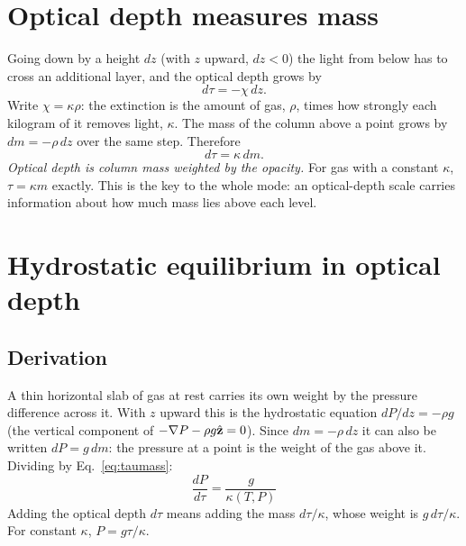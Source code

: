 \section{Optical depth measures mass}\label{sec:taumass}
Going down by a height $dz$ (with $z$ upward, $dz<0$) the light from below has to cross an additional layer, and the optical
depth grows by
\begin{equation}
d\tau=-\chi\,dz .\label{eq:dtau}
\end{equation}
Write $\chi=\kappa\rho$: the extinction is the amount of gas, $\rho$, times how strongly each kilogram of it removes light,
$\kappa$. The mass of the column above a point grows by $dm=-\rho\,dz$ over the same step. Therefore
\begin{equation}
d\tau=\kappa\,dm .\label{eq:taumass}
\end{equation}
\emph{Optical depth is column mass weighted by the opacity.} For gas with a constant $\kappa$, $\tau=\kappa m$ exactly. This
is the key to the whole mode: an optical-depth scale carries information about how much mass lies above each level.

\section{Hydrostatic equilibrium in optical depth}\label{sec:hse}
\subsection{Derivation}
A thin horizontal slab of gas at rest carries its own weight by the pressure difference across it. With $z$ upward this is
the hydrostatic equation $dP/dz=-\rho g$ (the vertical component of $-\nabla P-\rho g\hat{\mathbf z}=0$). Since $dm=-\rho\,dz$ it can
also be written $dP=g\,dm$: the pressure at a point is the weight of the gas above it. Dividing by Eq.~\eqref{eq:taumass}:
\begin{equation}
\boxed{\;\frac{dP}{d\tau}=\frac{g}{\kappa(T,P)}\;}\label{eq:hsetau}
\end{equation}
Adding the optical depth $d\tau$ means adding the mass $d\tau/\kappa$, whose weight is $g\,d\tau/\kappa$. For constant
$\kappa$, $P=g\tau/\kappa$.

